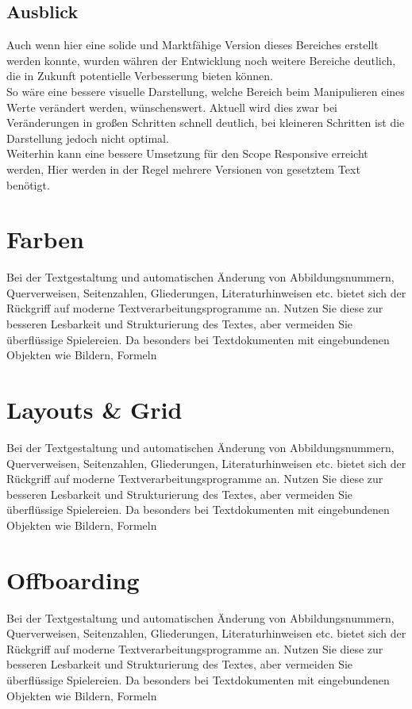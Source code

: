 \subsection{Ausblick}
Auch wenn hier eine solide und Marktfähige Version dieses Bereiches erstellt werden konnte, wurden währen der Entwicklung noch weitere Bereiche deutlich, die in Zukunft potentielle Verbesserung bieten können.\\
So wäre eine bessere visuelle Darstellung, welche Bereich beim Manipulieren eines Werte verändert werden, wünschenswert. Aktuell wird dies zwar bei Veränderungen in großen Schritten schnell deutlich, bei kleineren Schritten ist die Darstellung jedoch nicht optimal.\\
Weiterhin kann eine bessere Umsetzung für den Scope Responsive erreicht werden, Hier werden in der Regel mehrere Versionen von gesetztem Text benötigt.


\section{Farben}
Bei der Textgestaltung und automatischen Änderung von Abbildungsnummern, Querverweisen,
Seitenzahlen, Gliederungen, Literaturhinweisen etc. bietet sich der Rückgriff
auf moderne Textverarbeitungsprogramme an. Nutzen Sie diese zur besseren Lesbarkeit
und Strukturierung des Textes, aber vermeiden Sie überflüssige Spielereien. Da
besonders bei Textdokumenten mit eingebundenen Objekten wie Bildern, Formeln

\section{Layouts \& Grid}
Bei der Textgestaltung und automatischen Änderung von Abbildungsnummern, Querverweisen,
Seitenzahlen, Gliederungen, Literaturhinweisen etc. bietet sich der Rückgriff
auf moderne Textverarbeitungsprogramme an. Nutzen Sie diese zur besseren Lesbarkeit
und Strukturierung des Textes, aber vermeiden Sie überflüssige Spielereien. Da
besonders bei Textdokumenten mit eingebundenen Objekten wie Bildern, Formeln

\section{Offboarding}
Bei der Textgestaltung und automatischen Änderung von Abbildungsnummern, Querverweisen,
Seitenzahlen, Gliederungen, Literaturhinweisen etc. bietet sich der Rückgriff
auf moderne Textverarbeitungsprogramme an. Nutzen Sie diese zur besseren Lesbarkeit
und Strukturierung des Textes, aber vermeiden Sie überflüssige Spielereien. Da
besonders bei Textdokumenten mit eingebundenen Objekten wie Bildern, Formeln

